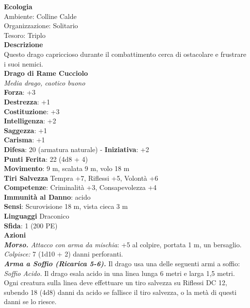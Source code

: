 \begin{multicols}{2}
\textbf{Ecologia}\\
Ambiente: Colline Calde\\
Organizzazione: Solitario\\
Tesoro: Triplo\\
\textbf{Descrizione}\\
Questo drago capriccioso durante il combattimento cerca di ostacolare e frustrare i suoi nemici.\\


\medskip\textbf{Drago di Rame Cucciolo}\\
\emph{Media drago, caotico buono}\\
\textbf{Forza}: +3\\
\textbf{Destrezza}: +1\\
\textbf{Costituzione}: +3\\
\textbf{Intelligenza}: +2\\
\textbf{Saggezza}: +1\\
\textbf{Carisma}: +1\\
\textbf{Difesa}: 20 (armatura naturale) - \textbf{Iniziativa}: +2\\
\textbf{Punti Ferita}: 22 (4d8 + 4)\\
\textbf{Movimento}: 9 m, scalata 9 m, volo 18 m\\
\textbf{Tiri Salvezza} Tempra +7, Riflessi +5, Volontà +6\\
\textbf{Competenze}: Criminalità +3, Consapevolezza +4\\
\textbf{Immunità al Danno}: acido\\
\textbf{Sensi}: Scurovisione 18 m, vista cieca 3 m\\
\textbf{Linguaggi} Draconico\\
\textbf{Sfida}: 1 (200 PE)\smallskip\\
\smallskip\textbf{Azioni}\\
\emph{\textbf{Morso.} Attacco con arma da mischia}: +5 al colpire, portata 1 m, un bersaglio.\\
\emph{Colpisce:} 7 (1d10 + 2) danni perforanti.\\
\emph{\textbf{Arma a Soffio (Ricarica 5-6).}} Il drago usa una delle seguenti armi a soffio:\\
\emph{Soffio Acido.} Il drago esala acido in una linea lunga 6 metri e larga 1,5 metri. Ogni creatura sulla linea deve effettuare un tiro salvezza su Riflessi DC  12, subendo 18 (4d8) danni da acido se fallisce il tiro salvezza, o la metà di questi danni se lo riesce.\\

\end{multicols}
